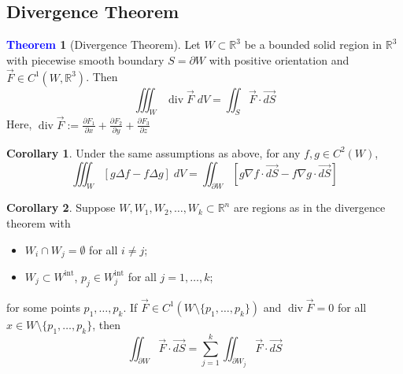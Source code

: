 \documentclass[11pt]{article}
\theoremstyle{definition}
\theoremstyle{definition}
\newcommand{\R}[0]{\mathbb{R}}
\DeclareMathOperator{\dive}{div}
\newtheorem{theorem}{\textcolor{blue}{Theorem}}
\newtheorem{corollary}{Corollary}
\theoremstyle{definition}
\theoremstyle{remark}
\begin{document}
\subsection{Divergence Theorem}

\begin{theorem}[Divergence Theorem]
    Let $W \subset \R^3$ be a bounded solid region in $\R^3$ with piecewise smooth boundary $S = \partial W$ with positive orientation and
    $\vec{F} \in C^1(W, \R^3)$. Then
    \[
        \iiint_W \dive \vec{F} \; dV = \iint_S \vec{F} \cdot \vec{dS}
    \]     
    Here, $\dive \vec{F} := \frac{\partial F_1}{\partial x} + \frac{\partial F_2}{\partial y} + \frac{\partial F_3}{\partial z}$
\end{theorem}

\begin{corollary}
    Under the same assumptions as above, for any $f, g \in C^2(W)$, 
    \[
        \iiint_W \left[g \Delta f - f \Delta g \right] \; dV = \iint_{\partial W} \left[ g \nabla f \cdot \vec{dS} - f \nabla g \cdot \vec{dS} \right]
    \]  
\end{corollary}

\begin{corollary}
    Suppose $W, W_1, W_2, \dots, W_k \subset \R^n$ are regions as in the divergence theorem with
    \begin{itemize}
        \item $W_i \cap W_j = \emptyset$ for all $i \neq j$;
        \item $W_j \subset W^{\text{int}}$, $p_j \in W_j^{\text{int}}$ for all $j = 1, \dots, k$;  
    \end{itemize}
    for some points $p_1, \dots, p_k$. If $\vec{F} \in C^1(W \setminus \{p_1, \dots, p_k\})$ and $\dive \vec{F} = 0$ for all $x \in W \setminus \{p_1, \dots, p_k\}$, then
    \[
        \iint_{\partial W} \vec{F} \cdot \vec{dS} = \sum_{j = 1}^k \iint_{\partial W_j} \vec{F} \cdot \vec{dS}
    \]  
\end{corollary}
\end{document}
